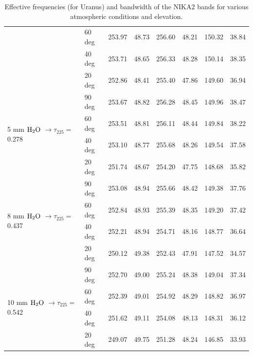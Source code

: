 \begin{table}[th]
\begin{center}
\begin{tabular}{|l|l|r|r|r|r|r|r|}
 & 60 deg & 253.97 & 48.73 & 256.60 & 48.21 & 150.32 & 38.84 \\
 & 40 deg & 253.71 & 48.65 & 256.33 & 48.28 & 150.14 & 38.35 \\
 & 20 deg & 252.86 & 48.41 & 255.40 & 47.86 & 149.60 & 36.94 \\
\hline
\multirow{4}{*}{5 mm $\rm H_2O$ $\rightarrow \tau_{225}=$0.278} & 90 deg &  253.67 & 48.82 & 256.28 & 48.45 & 149.96 & 38.47 \\
 & 60 deg & 253.51 & 48.81 & 256.11 & 48.44 & 149.84 & 38.22 \\
 & 40 deg & 253.10 & 48.77 & 255.68 & 48.26 & 149.54 & 37.58 \\
 & 20 deg & 251.74 & 48.67 & 254.20 & 47.75 & 148.68 & 35.82 \\
\hline
\multirow{4}{*}{8 mm $\rm H_2O$ $\rightarrow \tau_{225}=$0.437} & 90 deg &  253.08 & 48.94 & 255.66 & 48.42 & 149.38 & 37.76 \\
 & 60 deg & 252.84 & 48.93 & 255.39 & 48.35 & 149.20 & 37.42 \\
 & 40 deg & 252.21 & 48.94 & 254.71 & 48.16 & 148.77 & 36.64 \\
 & 20 deg & 250.12 & 49.38 & 252.43 & 47.91 & 147.52 & 34.57 \\
\hline
\multirow{4}{*}{10 mm $\rm H_2O$ $\rightarrow \tau_{225}=$0.542} & 90 deg &  252.70 & 49.00 & 255.24 & 48.38 & 149.04 & 37.34 \\
 & 60 deg & 252.39 & 49.01 & 254.92 & 48.29 & 148.82 & 36.97 \\
 & 40 deg & 251.62 & 49.11 & 254.08 & 48.13 & 148.31 & 36.12 \\
 & 20 deg & 249.07 & 49.75 & 251.28 & 48.24 & 146.85 & 33.93 \\
\hline
\end{tabular}
\caption[Effective frequencies and bandwidthes]{Effective frequencies (for Uranus) and bandwidth of the NIKA2 bands for
  various atmospheric conditions and elevation.}
\label{tab:bandwidths}
\end{center}
\end{table}


